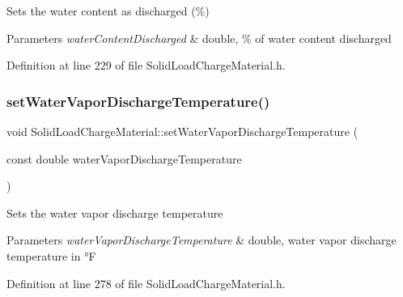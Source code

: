 Sets the water content as discharged (\%) 
\begin{DoxyParams}{Parameters}
{\em water\+Content\+Discharged} & double, \% of water content discharged \\
\hline
\end{DoxyParams}


Definition at line 229 of file Solid\+Load\+Charge\+Material.\+h.

\mbox{\label{class_solid_load_charge_material_af7837868e494c16aba5a2c3e1220106d}} 
\subsubsection{\texorpdfstring{set\+Water\+Vapor\+Discharge\+Temperature()}{setWaterVaporDischargeTemperature()}\hspace{0.1cm}{\footnotesize\ttfamily [1/3]}}
{\footnotesize\ttfamily void Solid\+Load\+Charge\+Material\+::set\+Water\+Vapor\+Discharge\+Temperature (\begin{DoxyParamCaption}\item[{const double}]{water\+Vapor\+Discharge\+Temperature }\end{DoxyParamCaption})\hspace{0.3cm}{\ttfamily [inline]}}

Sets the water vapor discharge temperature 
\begin{DoxyParams}{Parameters}
{\em water\+Vapor\+Discharge\+Temperature} & double, water vapor discharge temperature in °F \\
\hline
\end{DoxyParams}


Definition at line 278 of file Solid\+Load\+Charge\+Material.\+h.

\mbox{\label{class_solid_load_charge_material_af7837868e494c16aba5a2c3e1220106d}} 
